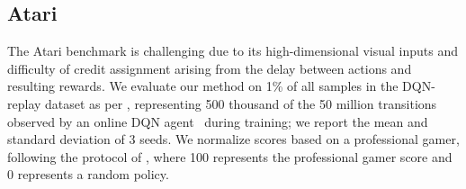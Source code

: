 \subsection{Atari}

The Atari benchmark \citep{bellemare2013arcade} is challenging due to its high-dimensional visual inputs and difficulty of credit assignment arising from the delay between actions and resulting rewards.
We evaluate our method on 1\% of all samples in the DQN-replay dataset as per \citet{agarwal2020optimistic}, representing 500 thousand of the 50 million transitions observed by an online DQN agent~\citep{mnih2015human} during training; we report the mean and standard deviation of 3 seeds.
We normalize scores based on a professional gamer, following the protocol of \citet{hafner2020mastering}, where 100 represents the professional gamer score and 0 represents a random policy.


